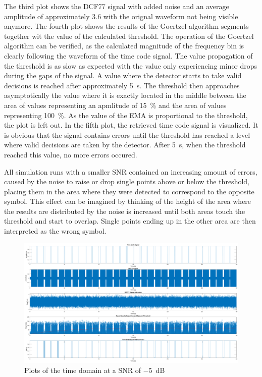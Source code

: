 \documentclass[conference]{IEEEtran}
\begin{document}
The third plot shows the DCF77 signal with added noise and an average amplitude of approximately $3.6$ with the orignal waveform not being visible anymore.
The fourth plot shows the results of the Goertzel algorithm segments together wit the value of the calculated threshold.
The operation of the Goertzel algorithm can be verified, as the calculated magnitude of the frequency bin is clearly following the waveform of the time code signal.
The value propagation of the threshold is as slow as expected with the value only experiencing minor drops during the gaps of the signal.
A value where the detector starts to take valid decisions is reached after approximately \SI{5}{\second}.
The threshold then approaches asymptotically the value where it is exactly located in the middle between the area of values representing an apmlitude of \SI{15}{\percent} and
the area of values representing \SI{100}{\percent}.
As the value of the EMA is proportional to the threshold, the plot is left out.
In the fifth plot, the retrieved time code signal is visualized.
It is obvious that the signal contains errors until the threshold has reached a level where valid decisions are taken by the detector.
After \SI{5}{\second}, when the threshold reached this value, no more errors occured.
\par
All simulation runs with a smaller SNR contained an increasing amount of errors, caused by the noise to raise or drop single points above or below the threshold, placing them in the
area where they were detected to correspond to the opposite symbol.
This effect can be imagined by thinking of the height of the area where the results are distributed by the noise is increased until both areas touch the threshold and start to overlap.
Single points ending up in the other area are then interpreted as the wrong symbol. 

\begin{figure}[!htbp]
    \centerline{\includegraphics[width=1.1\textwidth]{img/sim_td_m5dB.eps}}
    \caption{Plots of the time domain at a SNR of \SI{-5}{\deci\bel}}
    \label{fig:sim_td_m5dB}
\end{figure}
\end{document}
